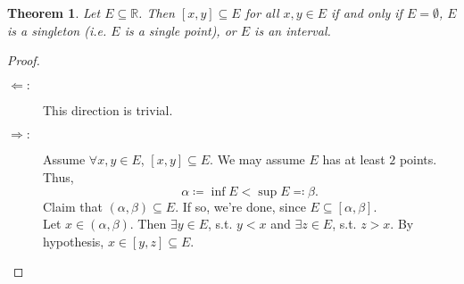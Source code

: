 \documentclass[12pt]{article}
\theoremstyle{plain}
\newtheorem{thm}{Theorem}
\theoremstyle{definition}
\begin{document}
\begin{thm}
    Let $E\subseteq \mathbb{R}$.
    Then $[x,y]\subseteq E$ for all  $x,y\in E$ if and only if $E=\emptyset$, $E$ is a singleton (i.e. $E$ is
    a single point), or $E$ is an interval.
\end{thm}
\begin{proof}
    \begin{description}
        \item[$\Leftarrow:$] This direction is trivial.
        \item[$\Rightarrow:$] Assume $\forall x,y\in E$, $[x,y]\subseteq E$.
        We may assume $E$ has at least $2$ points.
        Thus, $$\alpha\coloneqq \inf E<\sup E\eqqcolon \beta.$$
        Claim that $(\alpha,\beta)\subseteq E$.
        If so, we're done, since $E\subseteq [\alpha,\beta]$.\\
        Let $x\in(\alpha,\beta)$.
        Then $\exists y\in E$, s.t. $y<x$ and $\exists z\in E$, s.t. $z>x$.
        By hypothesis, $x\in[y,z]\subseteq E$.
    \end{description}
\end{proof}
\end{document}
